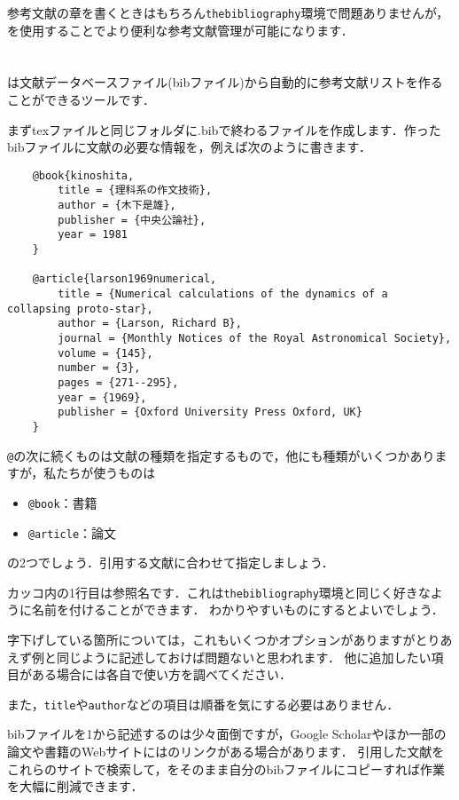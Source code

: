 \documentclass[a4paper,11pt]{jsreport}
\numberwithin{equation}{section}
\theoremstyle{definition}
\begin{document}
参考文献の章を書くときはもちろん\verb|thebibliography|環境で問題ありませんが，
\BibTeX を使用することでより便利な参考文献管理が可能になります．

\section{\BibTeX}

 {\BibTeX}は文献データベースファイル(bibファイル)から自動的に参考文献リストを作ることができるツールです\cite{bibunsyo}．

まずtexファイルと同じフォルダに.bibで終わるファイルを作成します．作ったbibファイルに文献の必要な情報を，例えば次のように書きます．
\begin{verbatim}
    @book{kinoshita,
        title = {理科系の作文技術},
        author = {木下是雄},
        publisher = {中央公論社},
        year = 1981
    }

    @article{larson1969numerical,
        title = {Numerical calculations of the dynamics of a collapsing proto-star},
        author = {Larson, Richard B},
        journal = {Monthly Notices of the Royal Astronomical Society},
        volume = {145},
        number = {3},
        pages = {271--295},
        year = {1969},
        publisher = {Oxford University Press Oxford, UK}
    }
\end{verbatim}

\verb|@|の次に続くものは文献の種類を指定するもので，他にも種類がいくつかありますが，私たちが使うものは
\begin{itemize}
    \item \verb|@book|：書籍
    \item \verb|@article|：論文
\end{itemize}
の2つでしょう．引用する文献に合わせて指定しましょう．

カッコ内の1行目は参照名です．これは\verb|thebibliography|環境と同じく好きなように名前を付けることができます．
わかりやすいものにするとよいでしょう．

字下げしている箇所については，これもいくつかオプションがありますがとりあえず例と同じように記述しておけば問題ないと思われます．
他に追加したい項目がある場合には各自で使い方を調べてください．

また，\verb|title|や\verb|author|などの項目は順番を気にする必要はありません．

bibファイルを1から記述するのは少々面倒ですが，Google Scholarやほか一部の論文や書籍のWebサイトには{\BibTeX}のリンクがある場合があります．
引用した文献をこれらのサイトで検索して，{\BibTeX}をそのまま自分のbibファイルにコピーすれば作業を大幅に削減できます．
\end{document}
